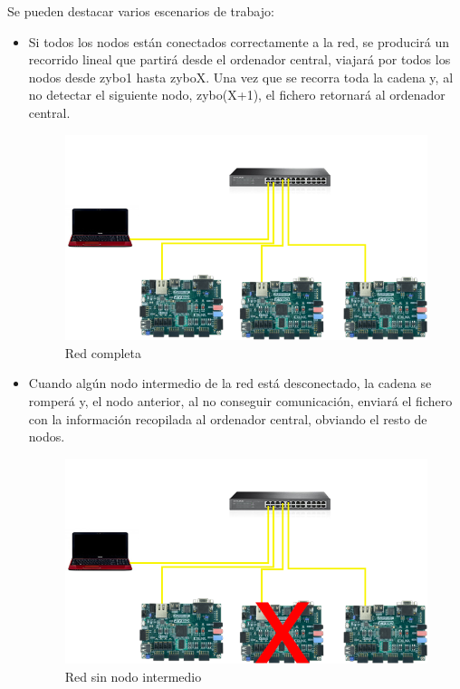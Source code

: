 Se pueden destacar varios escenarios de trabajo:
\begin{itemize}
	\item Si todos los nodos están conectados correctamente a la red, se producirá un recorrido lineal que partirá desde el ordenador central, viajará por todos los nodos desde zybo1 hasta zyboX. Una vez que se recorra toda la cadena y, al no detectar el siguiente nodo, zybo(X+1), el fichero retornará al ordenador central.
	\begin{figure}[h]
		\centering
		\includegraphics[scale=0.5]{Epilogo/RedCompleta.png}
		\caption{Red completa}
		\label{Red completa}
	\end{figure}
\newpage
	\item Cuando algún nodo intermedio de la red está desconectado, la cadena se romperá y, el nodo anterior, al no conseguir comunicación, enviará el fichero con la información recopilada al ordenador central, obviando el resto de nodos.
	\begin{figure}[h]
		\centering
		\includegraphics[scale=0.5]{Epilogo/RedSinNodo2.png}
		\caption{Red sin nodo intermedio}
		\label{Red sin nodo intermedio}

\end{figure}
\end{itemize}
